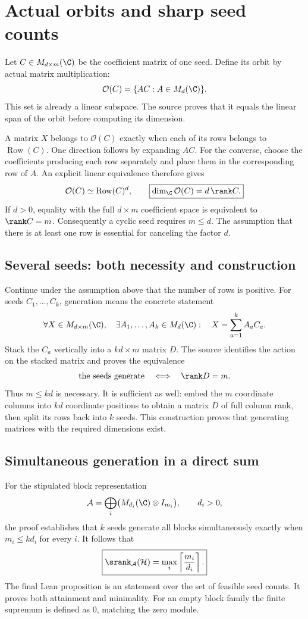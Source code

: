 \section{Actual orbits and sharp seed counts}\label{supp3:section:001}
Let $C\in M_{d\times m}(\C)$ be the coefficient matrix of one seed. Define its orbit by actual matrix multiplication:
\[
\mathcal O(C)=\{AC:A\in M_d(\C)\}.
\]
This set is already a linear subspace. The source proves that it equals the linear span of the orbit before computing its dimension.

A matrix $X$ belongs to $\mathcal O(C)$ exactly when each of its rows belongs to $\operatorname{Row}(C)$. One direction follows by expanding $AC$. For the converse, choose the coefficients producing each row separately and place them in the corresponding row of $A$. An explicit linear equivalence therefore gives
\[
\mathcal O(C)\simeq \operatorname{Row}(C)^d,
\qquad
\boxed{\dim_\C\mathcal O(C)=d\,\rank C.}
\]
If $d>0$, equality with the full $d\times m$ coefficient space is equivalent to $\rank C=m$. Consequently a cyclic seed requires $m\le d$. The assumption that there is at least one row is essential for canceling the factor $d$.

\subsection{Several seeds: both necessity and construction}
Continue under the assumption above that the number of rows is positive. For seeds $C_1,\ldots,C_k$, generation means the concrete statement
\[
\forall X\in M_{d\times m}(\C),\quad
\exists A_1,\ldots,A_k\in M_d(\C):\quad
X=\sum_{a=1}^k A_aC_a.
\]
Stack the $C_a$ vertically into a $kd\times m$ matrix $D$. The source identifies the action on the stacked matrix and proves the equivalence
\[
\text{the seeds generate}\quad\Longleftrightarrow\quad\rank D=m.
\]
Thus $m\le kd$ is necessary. It is sufficient as well: embed the $m$ coordinate columns into $kd$ coordinate positions to obtain a matrix $D$ of full column rank, then split its rows back into $k$ seeds. This construction proves that generating matrices with the required dimensions exist.

\subsection{Simultaneous generation in a direct sum}
For the stipulated block representation
\[
\mathcal A=\bigoplus_i\bigl(M_{d_i}(\C)\otimes I_{m_i}\bigr),\qquad d_i>0,
\]
the proof establishes that $k$ seeds generate all blocks simultaneously exactly when $m_i\le kd_i$ for every $i$. It follows that
\[
\boxed{\srank_{\mathcal A}(\mathcal H)=\max_i\left\lceil\frac{m_i}{d_i}\right\rceil.}
\]
The final Lean proposition is an  statement over the set of feasible seed counts. It proves both attainment and minimality. For an empty block family the finite supremum is defined as $0$, matching the zero module.





